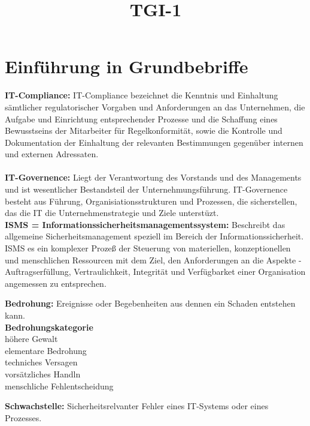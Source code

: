\documentclass[a4paper,10pt]{scrartcl}
\title{TGI-1}
\author{}
\begin{document}
\section{Einführung in Grundbebriffe}

\textbf{IT-Compliance: }  IT-Compliance bezeichnet die Kenntnis und
Einhaltung sämtlicher regulatorischer
Vorgaben und Anforderungen an das
Unternehmen, die Aufgabe und Einrichtung
entsprechender Prozesse und die Schaffung
eines Bewusstseins der Mitarbeiter für
Regelkonformität, sowie die Kontrolle und
Dokumentation der Einhaltung der
relevanten Bestimmungen gegenüber
internen und externen Adressaten.
\\
\\
\textbf{IT-Governence: } Liegt der Verantwortung des Vorstands und des Managements und ist wesentlicher Bestandsteil der 
Unternehmungsführung. IT-Governence besteht aus Führung, Organisiationsstrukturen und Prozessen, die sicherstellen,
das die IT die Unternehmenstrategie und Ziele unterstüzt.
\\
\textbf{ISMS = Informationssicherheitsmanagementssystem: } Beschreibt das allgemeine Sicherheitsmanagement speziell im Bereich der
Informationssicherheit. ISMS es ein komplexer Prozeß der Steuerung von materiellen, konzeptionellen und menschlichen Ressourcen mit
dem Ziel, den Anforderungen an die Aspekte -Auftragserfüllung, Vertraulichkeit, Integrität und Verfügbarket einer Organisation
angemessen zu entsprechen.

\textbf{Bedrohung:}
Ereignisse oder Begebenheiten aus dennen ein Schaden entstehen kann.\\

\textbf{Bedrohungskategorie}\\
höhere Gewalt\\
elementare Bedrohung\\
techniches Versagen\\
vorsätzliches Handln\\
menschliche Fehlentscheidung

\textbf {Schwachstelle:} Sicherheitsrelvanter Fehler eines IT-Systems oder eines Prozesses.
\end{document}
